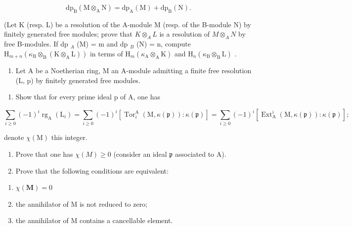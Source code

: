 \[
\mathrm{dp} _ {\mathrm{B}} (\mathrm{M} \otimes_ {\mathrm{A}} \mathrm{N}) = \mathrm{dp} _ {\mathrm{A}} (\mathrm{M}) + \mathrm{dp} _ {\mathrm{B}} (\mathrm{N}).
\]

(Let K (resp. L) be a resolution of the A-module M (resp. of the B-module N) by finitely generated free modules; prove that \(K \otimes_{A} L\) is a resolution of \(M \otimes_{A} N\) by free B-modules. If dp \(_{A}\) (M) = m and dp \(_{B}\) (N) = n, compute \(\mathrm{H}_{m+n}(\kappa_{\mathrm{B}} \otimes_{\mathrm{B}} (\mathrm{K} \otimes_{\mathrm{A}} \mathrm{L}))\) in terms of \(\mathrm{H}_{m}(\kappa_{\mathrm{A}} \otimes_{\mathrm{A}} \mathrm{K})\) and \(\mathrm{H}_{n}(\kappa_{\mathrm{B}} \otimes_{\mathrm{B}} \mathrm{L})\) .

\begin{enumerate}
\def\labelenumi{\arabic{enumi})}
\setcounter{enumi}{1}
\tightlist
\item
  Let A be a Noetherian ring, M an A-module admitting a finite free resolution (L, p) by finitely generated free modules.
\end{enumerate}

\begin{enumerate}
\def\labelenumi{\alph{enumi})}
\tightlist
\item
  Show that for every prime ideal p of A, one has
\end{enumerate}

\[
\sum_ {i \geqslant 0} (- 1) ^ {i} \operatorname{rg} _ {\mathrm{A}} (\mathrm{L} _ {i}) = \sum_ {i \geqslant 0} (- 1) ^ {i} \left[ \operatorname{Tor} _ {i} ^ {\mathrm{A}} (\mathrm{M}, \kappa (\mathfrak {p})): \kappa (\mathfrak {p}) \right] = \sum_ {i \geqslant 0} (- 1) ^ {i} \left[ \operatorname{Ext} _ {\mathrm{A}} ^ {i} (\mathrm{M}, \kappa (\mathfrak {p})): \kappa (\mathfrak {p}) \right];
\]

denote \(\chi(\mathrm{M})\) this integer.

\begin{enumerate}
\def\labelenumi{\alph{enumi})}
\setcounter{enumi}{1}
\item
  Prove that one has \(\chi(M) \geqslant 0\) (consider an ideal \(\mathfrak{p}\) associated to A).
\item
  Prove that the following conditions are equivalent:
\end{enumerate}

\begin{enumerate}
\def\labelenumi{(\roman{enumi})}
\item
  \(\chi (\mathbf{M}) = 0\)
\item
  the annihilator of M is not reduced to zero;
\item
  the annihilator of M contains a cancellable element.
\end{enumerate}

